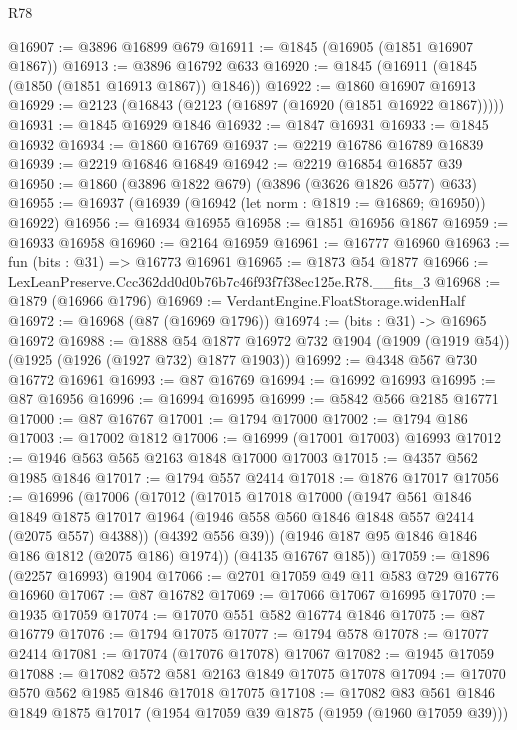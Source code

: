 \begin{lexlean}{R78}
\begin{coremodule}
@16907 := @3896 @16899 @679
@16911 := @1845 (@16905 (@1851 @16907 @1867))
@16913 := @3896 @16792 @633
@16920 := @1845 (@16911 (@1845 (@1850 (@1851 @16913 @1867)) @1846))
@16922 := @1860 @16907 @16913
@16929 := @2123 (@16843 (@2123 (@16897 (@16920 (@1851 @16922 @1867)))))
@16931 := @1845 @16929 @1846
@16932 := @1847 @16931
@16933 := @1845 @16932
@16934 := @1860 @16769
@16937 := @2219 @16786 @16789 @16839
@16939 := @2219 @16846 @16849
@16942 := @2219 @16854 @16857 @39
@16950 := @1860 (@3896 @1822 @679) (@3896 (@3626 @1826 @577) @633)
@16955 := @16937 (@16939 (@16942 (let norm : @1819 := @16869; @16950)) @16922)
@16956 := @16934 @16955
@16958 := @1851 @16956 @1867
@16959 := @16933 @16958
@16960 := @2164 @16959
@16961 := @16777 @16960
@16963 := fun (bits : @31) => @16773 @16961
@16965 := @1873 @54 @1877
@16966 := LexLeanPreserve.Ccc362dd0d0b76b7c46f93f7f38ec125e.R78.__fits_3
@16968 := @1879 (@16966 @1796)
@16969 := VerdantEngine.FloatStorage.widenHalf
@16972 := @16968 (@87 (@16969 @1796))
@16974 := (bits : @31) -> @16965 @16972
@16988 := @1888
    @54
    @1877
    @16972
    @732
    @1904
    (@1909 (@1919 @54))
    (@1925 (@1926 (@1927 @732) @1877 @1903))
@16992 := @4348 @567 @730 @16772 @16961
@16993 := @87 @16769
@16994 := @16992 @16993
@16995 := @87 @16956
@16996 := @16994 @16995
@16999 := @5842 @566 @2185 @16771
@17000 := @87 @16767
@17001 := @1794 @17000
@17002 := @1794 @186
@17003 := @17002 @1812
@17006 := @16999 (@17001 @17003) @16993
@17012 := @1946 @563 @565 @2163 @1848 @17000 @17003
@17015 := @4357 @562 @1985 @1846
@17017 := @1794 @557 @2414
@17018 := @1876 @17017
@17056 := @16996
    (@17006
      (@17012
        (@17015
          @17018
          @17000
          (@1947
            @561
            @1846
            @1849
            @1875
            @17017
            @1964
            (@1946 @558 @560 @1846 @1848 @557 @2414 (@2075 @557) @4388))
          (@4392 @556 @39))
        (@1946 @187 @95 @1846 @1846 @186 @1812 (@2075 @186) @1974))
      (@4135 @16767 @185))
@17059 := @1896 (@2257 @16993) @1904
@17066 := @2701 @17059 @49 @11 @583 @729 @16776 @16960
@17067 := @87 @16782
@17069 := @17066 @17067 @16995
@17070 := @1935 @17059
@17074 := @17070 @551 @582 @16774 @1846
@17075 := @87 @16779
@17076 := @1794 @17075
@17077 := @1794 @578
@17078 := @17077 @2414
@17081 := @17074 (@17076 @17078) @17067
@17082 := @1945 @17059
@17088 := @17082 @572 @581 @2163 @1849 @17075 @17078
@17094 := @17070 @570 @562 @1985 @1846 @17018 @17075
@17108 := @17082
    @83
    @561
    @1846
    @1849
    @1875
    @17017
    (@1954 @17059 @39 @1875 (@1959 (@1960 @17059 @39)))

\end{coremodule}
\end{lexlean}
